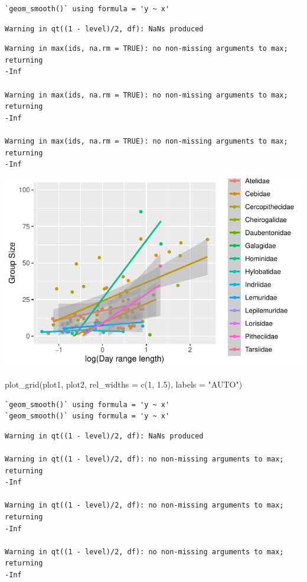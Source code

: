 \documentclass[
  letterpaper,
  DIV=11,
  numbers=noendperiod]{scrartcl}
\newenvironment{Shaded}{\begin{snugshade}}{\end{snugshade}}
\newcommand{\AttributeTok}[1]{\textcolor[rgb]{0.40,0.45,0.13}{#1}}
\newcommand{\DecValTok}[1]{\textcolor[rgb]{0.68,0.00,0.00}{#1}}
\newcommand{\FloatTok}[1]{\textcolor[rgb]{0.68,0.00,0.00}{#1}}
\newcommand{\FunctionTok}[1]{\textcolor[rgb]{0.28,0.35,0.67}{#1}}
\newcommand{\NormalTok}[1]{\textcolor[rgb]{0.00,0.23,0.31}{#1}}
\newcommand{\StringTok}[1]{\textcolor[rgb]{0.13,0.47,0.30}{#1}}
\begin{document}
\begin{verbatim}
`geom_smooth()` using formula = 'y ~ x'
\end{verbatim}

\begin{verbatim}
Warning in qt((1 - level)/2, df): NaNs produced
\end{verbatim}

\begin{verbatim}
Warning in max(ids, na.rm = TRUE): no non-missing arguments to max; returning
-Inf

Warning in max(ids, na.rm = TRUE): no non-missing arguments to max; returning
-Inf

Warning in max(ids, na.rm = TRUE): no non-missing arguments to max; returning
-Inf
\end{verbatim}

\includegraphics{EDA-challenge_files/figure-pdf/unnamed-chunk-4-2.pdf}

\begin{Shaded}
\begin{Highlighting}[]
\FunctionTok{plot\_grid}\NormalTok{(plot1, plot2, }\AttributeTok{rel\_widths =} \FunctionTok{c}\NormalTok{(}\DecValTok{1}\NormalTok{, }\FloatTok{1.5}\NormalTok{), }\AttributeTok{labels =} \StringTok{"AUTO"}\NormalTok{)}
\end{Highlighting}
\end{Shaded}

\begin{verbatim}
`geom_smooth()` using formula = 'y ~ x'
`geom_smooth()` using formula = 'y ~ x'
\end{verbatim}

\begin{verbatim}
Warning in qt((1 - level)/2, df): NaNs produced

Warning in qt((1 - level)/2, df): no non-missing arguments to max; returning
-Inf

Warning in qt((1 - level)/2, df): no non-missing arguments to max; returning
-Inf

Warning in qt((1 - level)/2, df): no non-missing arguments to max; returning
-Inf
\end{verbatim}
\end{document}

